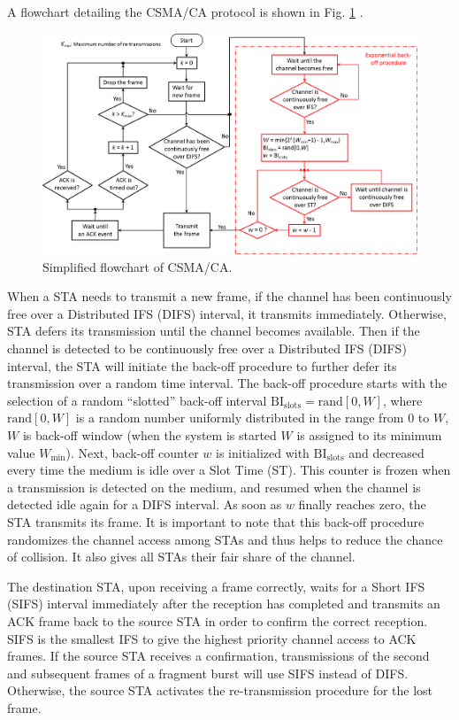 A flowchart detailing the CSMA/CA protocol is shown in Fig. \ref{figs:CSMA-CA-flowchart} \cite{80211}. 
\begin{figure}[!th]
	\centering
	\includegraphics[width=1.0\columnwidth]{figs/CSMA-CA-flowchart}
	\caption{Simplified flowchart of CSMA/CA.}
	\label{figs:CSMA-CA-flowchart}
\end{figure}
When a STA needs to transmit a new frame, if the channel has been continuously free over a Distributed IFS (DIFS) interval, it transmits immediately. Otherwise, STA defers its transmission until the channel becomes available. Then if the channel is detected to be continuously free over a Distributed IFS (DIFS) interval, the STA will initiate the back-off procedure to further defer its transmission over a random time interval. The back-off procedure starts with the selection of a random ``slotted'' back-off interval $\mathrm{BI_{slots}} = \mathrm{rand}[0,W]$, where $\mathrm{rand}[0,W]$ is a random number uniformly distributed in the range from $0$ to $W$, $W$ is back-off window (when the system is started $W$ is assigned to its minimum value $W_{\min}$). Next, back-off counter $w$ is initialized with $\mathrm{BI_{slots}}$ and decreased every time the medium is idle over a Slot Time (ST). This counter is frozen when a transmission is detected on the medium, and resumed when the channel is detected idle again for a DIFS interval. As soon as $w$ finally reaches zero, the STA transmits its frame. It is important to note that this back-off procedure randomizes the channel access among STAs and thus helps to reduce the chance of collision. It also gives all STAs their fair share of the channel.

The destination STA, upon receiving a frame correctly, waits for a Short IFS (SIFS) interval immediately after the reception has completed and transmits an ACK frame back to the source STA in order to confirm the correct reception. SIFS is the smallest IFS to give the highest priority channel access to ACK frames. If the source STA receives a confirmation, transmissions of the second and subsequent frames of a fragment burst will use SIFS instead of DIFS. Otherwise, the source STA activates the re-transmission procedure for the lost frame.

